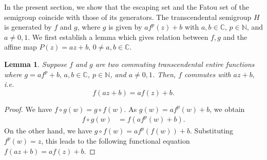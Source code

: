 \documentclass[a4paper,12pt]{amsart}
\newcommand{\C}{\mathbb{C}}
\numberwithin{equation}{section}
\newtheorem{lemma}[theorem]{Lemma}
\begin{document}
 In the present section, we show that the escaping set and the Fatou set of the semigroup coincide with those of its generators. The transcendental semigroup $H$ is generated by $f$ and $g$, where $g$ is given by $af^p(z) + b$ with $a,b \in \mathbb{C}$, $p \in \mathbb{N}$, and $a \neq 0,1$. We first establish a lemma which gives relation between $f, g$ and the affine map $P(z)=az+b, \, 0\neq a,b \in \C$.
	\begin{lemma}\label{l2}
		Suppose $f$ and $g$ are two commuting transcendental entire functions where $g=af^p+b,\, a,b\in \mathbb{C}$, $p\in \mathbb{N}$, and $a \neq 0,1$. Then, $f$ commutes with $az+b,$ i.e.
		\[
		f(az+b)=af(z)+b.
		\]
	\end{lemma}
	
	\begin{proof}
		We have $f\circ g(w)=g\circ f(w)$.
		As $g(w)=af^p(w)+b$, we obtain
		\begin{align*}
			f\circ g(w)
			&= f(af^p(w)+b).
		\end{align*}
		On the other hand, we have $g\circ f(w)=af^p(f(w))+b$. Substituting $f^p(w)=z$, this leads to the following functional equation $f(az+b)=af(z)+b$.
	\end{proof} 
	
\end{document}
